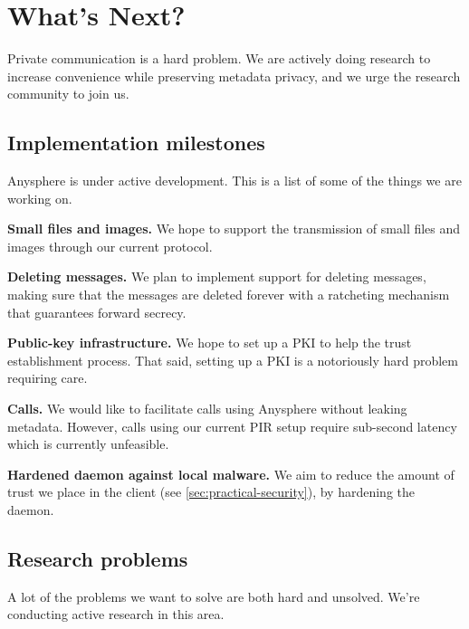 \section{What's Next?}
\label{sec:future}

Private communication is a hard problem. We are actively doing research to increase convenience while preserving metadata privacy, and we urge the research community to join us.


\subsection{Implementation milestones}
Anysphere is under active development. This is a list of some of the things we are working on.

\textbf{Small files and images.} We hope to support the transmission of small files and images through our current protocol.

\textbf{Deleting messages.} We plan to implement support for deleting messages, making sure that the messages are deleted forever with a ratcheting mechanism that guarantees forward secrecy.

\textbf{Public-key infrastructure.} We hope to set up a PKI to help the trust establishment process. That said, setting up a PKI is a notoriously hard problem requiring care.

\textbf{Calls.} We would like to facilitate calls using Anysphere without leaking metadata. However, calls using our current PIR setup require sub-second latency which is currently unfeasible.

\textbf{Hardened daemon against local malware.} We aim to reduce the amount of trust we place in the client (see \cref{sec:practical-security}), by hardening the daemon.

\subsection{Research problems} 
A lot of the problems we want to solve are both hard and unsolved. We're conducting active research in this area.

